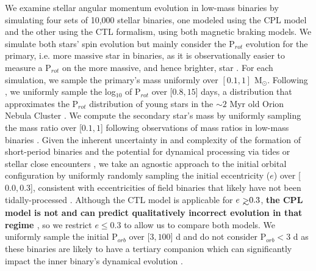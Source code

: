 \documentclass[twocolumn]{aastex61}
\def\gsim{~\rlap{$>$}{\lower 1.0ex\hbox{$\sim$}}}
\newcommand{\xxx}[1]{{\textbf{#1}}}
\begin{document}
We examine stellar angular momentum evolution in low-mass binaries by simulating four sets of 10,000 stellar binaries, one modeled using the CPL model and the other using the CTL formalism, using both magnetic braking models.  We simulate both stars' spin evolution but mainly consider the P$_{rot}$ evolution for the primary, i.e. more massive star in binaries, as it is observationally easier to measure a P$_{rot}$ on the more massive, and hence brighter, star \citep[e.g.][]{Meibom2006,Lurie2017}. For each simulation, we sample the primary's mass uniformly over $[0.1, 1]$ M$_{\odot}$. Following \citet{Matt2015}, we uniformly sample the log$_{10}$ of P$_{rot}$ over [$0.8,15$] days, a distribution that approximates the P$_{rot}$ distribution of young stars in the ${\sim}2$ Myr old Orion Nebula Cluster \citep{Stassun1999,Herbst2001,Herbst2002,Rodriguez-Ledesma2009}.  We compute the secondary star's mass by uniformly sampling the mass ratio over [$0.1, 1$] following observations of mass ratios in low-mass binaries \citep{Raghavan2010,Moe2018}. Given the inherent uncertainty in and complexity of the formation of short-period binaries \citep[e.g.][]{Bonnell1994,Bate2000,Bate2002,Moe2018} and the potential for dynamical processing via tides or stellar close encounters \citep[e.g.][]{Mardling2001,Hurley2002,Ivanova2005,Meibom2005}, we take an agnostic approach to the initial orbital configuration by uniformly randomly sampling the initial eccentricity ($e$) over [$0.0,0.3$], consistent with eccentricities of field binaries that likely have not been tidally-processed \citep{Raghavan2010}. Although the CTL model is applicable for $e \gsim 0.3$, \xxx{the CPL model is not and can predict qualitatively incorrect evolution in that regime \citep[see Section 4.1 in][]{Leconte2010}}, so we restrict $e \leq 0.3$ to allow us to compare both models.
We uniformly sample the initial P$_{orb}$ over [$3,100$] d and do not consider P$_{orb} < 3$ d as these binaries are likely to have a tertiary companion \citep{Tokovinin2006} which can significantly impact the inner binary's dynamical evolution \citep[e.g.][]{Munoz2015,Martin2015b,Hamers2016,Moe2018}. 
\end{document}

